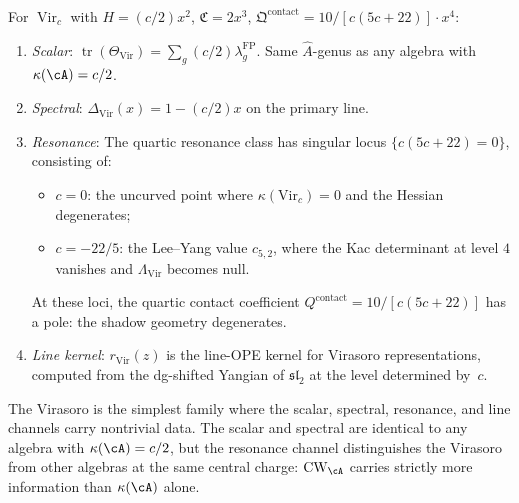 \begin{example}
\label{ex:chern-weil-virasoro}
For $\operatorname{Vir}_c$ with $H = (c/2)x^2$,
$\mathfrak{C} = 2x^3$,
$\mathfrak{Q}^{\mathrm{contact}} = 10/[c(5c{+}22)] \cdot x^4$:
\begin{enumerate}[label=\textup{(\roman*)}]
\item \emph{Scalar}: $\operatorname{tr}(\Theta_{\mathrm{Vir}})
= \sum_g (c/2)\lambda_g^{\mathrm{FP}}$. Same $\hat{A}$-genus as any algebra with $\kappa(\cA) = c/2$.
\item \emph{Spectral}:
$\Delta_{\mathrm{Vir}}(x) = 1 - (c/2)x$ on the primary line.
\item \emph{Resonance}: The quartic resonance class has singular
locus $\{c(5c{+}22) = 0\}$, consisting of:
\begin{itemize}
\item $c = 0$: the uncurved point where $\kappa(\mathrm{Vir}_c) = 0$ and the
Hessian degenerates;
\item $c = -22/5$: the Lee--Yang value $c_{5,2}$, where the
Kac determinant at level $4$ vanishes and $\Lambda_{\mathrm{Vir}}$
becomes null.
\end{itemize}
At these loci, the quartic contact coefficient
$Q^{\mathrm{contact}} = 10/[c(5c{+}22)]$ has a pole:
the shadow geometry degenerates.
\item \emph{Line kernel}: $r_{\mathrm{Vir}}(z)$ is the line-OPE
kernel for Virasoro representations, computed from the
dg-shifted Yangian of $\mathfrak{sl}_2$ at the level
determined by~$c$.
\end{enumerate}
The Virasoro is the simplest family where the scalar, spectral,
resonance, and line channels carry nontrivial data. The scalar and
spectral are identical to
any algebra with $\kappa(\cA) = c/2$, but the resonance channel
distinguishes the Virasoro from other algebras at the same central
charge: $\operatorname{CW}_{\cA}$ carries strictly
more information than $\kappa(\cA)$ alone.
\end{example}

